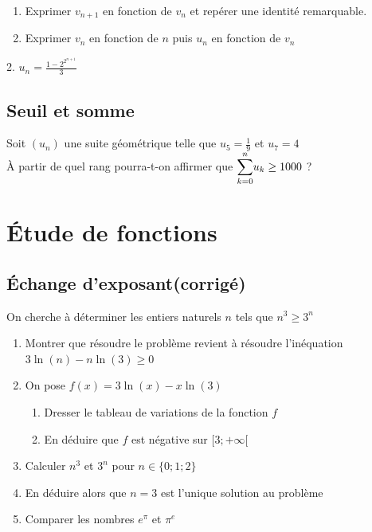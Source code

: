 \documentclass[oneside,12pt]{book}          %
\begin{document}
\begin{hint}
	\begin{enumerate}
		\item Exprimer $v_{n+1}$ en fonction de $v_n$ et repérer une identité remarquable.
		\item Exprimer $v_n$ en fonction de $n$ puis $u_n$ en fonction de $v_n$
	\end{enumerate}
\end{hint}
\begin{sol}
	2. $u_n=\frac{1-2^{2^{n+1}}}{3}$
\end{sol}



\subsection{Seuil et somme}
Soit $(u_n)$ une suite géométrique telle que $u_5=\frac{1}{9}$ et $u_7=4$\\
À partir de quel rang pourra-t-on affirmer que ${\displaystyle\sum_{k=0}^{n}}u_k \geq 1000$ ?


\section{Étude de fonctions}

\subsection{Échange d'exposant\quad\small{(corrigé)}}
On cherche à déterminer les entiers naturels $n$ tels que $n^3\geq3^n$
\begin{enumerate}
    \item Montrer que résoudre le problème revient à résoudre l'inéquation $3\ln(n)-n\ln(3)\geq0$
    \item On pose $f(x)=3\ln(x)-x\ln(3)$
    \begin{enumerate}
        \item Dresser le tableau de variations de la fonction $f$
        \item En déduire que $f$ est négative sur $[3;+\infty[$
    \end{enumerate}
    \item Calculer $n^3$ et $3^n$ pour $n\in\{0;1;2\}$
    \item En déduire alors que $n=3$ est l'unique solution au problème
    \item [$\dur$] Comparer les nombres $e^{\pi}$ et $\pi^e$
\end{enumerate}
\end{document}
